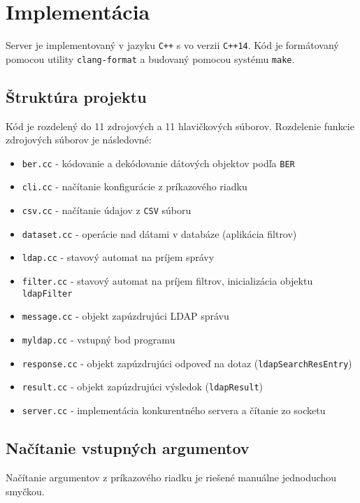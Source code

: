 \documentclass[12pt]{report}
\begin{document}
\chapter{Implementácia}

Server je implementovaný v jazyku \texttt{C++} s vo verzii \texttt{C++14}. Kód je formátovaný pomocou
utility \texttt{clang-format} a budovaný pomocou systému \texttt{make}.

\section{Štruktúra projektu}

Kód je rozdelený do 11 zdrojových a 11 hlavičkových súborov.
Rozdelenie funkcie zdrojových súborov je následovné:

\begin{itemize}
    \item \texttt{ber.cc} - kódovanie a dekódovanie dátových objektov podľa \texttt{BER}
    \item \texttt{cli.cc} - načítanie konfigurácie z príkazového riadku
    \item \texttt{csv.cc} - načítanie údajov z \texttt{CSV} súboru
    \item \texttt{dataset.cc} - operácie nad dátami v databáze (aplikácia filtrov)
    \item \texttt{ldap.cc} - stavový automat na príjem správy
    \item \texttt{filter.cc} - stavový automat na príjem filtrov, inicializácia objektu \texttt{ldapFilter}
    \item \texttt{message.cc} - objekt zapúzdrujúci LDAP správu
    \item \texttt{myldap.cc} - vstupný bod programu
    \item \texttt{response.cc} - objekt zapúzdrujúci odpoveď na dotaz (\texttt{ldapSearchResEntry})
    \item \texttt{result.cc} - objekt zapúzdrujúci výsledok (\texttt{ldapResult})
    \item \texttt{server.cc} - implementácia konkurentného servera a čítanie zo socketu
\end{itemize}

\section{Načítanie vstupných argumentov}

Načítanie argumentov z príkazového riadku je riešené manuálne jednoduchou smyčkou.
\end{document}
